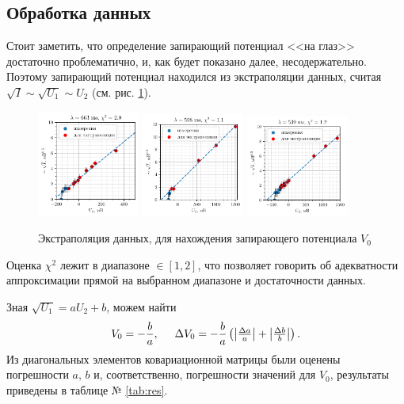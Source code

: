 \newpage
\subsection*{Обработка данных}



Стоит заметить, что определение запирающий потенциал <<на глаз>> достаточно проблематично, и, как будет показано далее, несодержательно. Поэтому запирающий потенциал находился из экстраполяции данных, считая $\sqrt{I} \sim \sqrt{U_1} \sim U_2$ (см. рис. \ref{fig:3plot}).


\begin{figure}[h]
    \centering
    \includegraphics[width=0.3\textwidth]{figs/fig3_1.pdf}
    \includegraphics[width=0.3\textwidth]{figs/fig3_3.pdf}
    \includegraphics[width=0.3\textwidth]{figs/fig3_2.pdf}
    \vspace{-3mm}
    \caption{Экстраполяция данных, для нахождения запирающего потенциала $V_0$}
    \label{fig:3plot}
\end{figure}

Оценка $\chi^2$ лежит в диапазоне $\in [1, 2]$, что позволяет говорить об адекватности аппроксимации прямой на выбранном диапазоне и достаточности данных.

Зная $\sqrt{U_1} = a U_2 + b$, можем найти
\begin{equation*}
    V_0 = - \frac{b}{a}, 
    \hspace{5 mm} 
    \Delta V_0 = - \frac{b}{a} \left(\big|\tfrac{\Delta a}{a}\big| + \big|\tfrac{\Delta b}{b}\big|\right).
\end{equation*}
Из диагональных элементов ковариационной матрицы были оценены погрешности $a,\, b$ и, соответственно, погрешности значений для $V_0$, результаты приведены в таблице № \ref{tab:res}.


